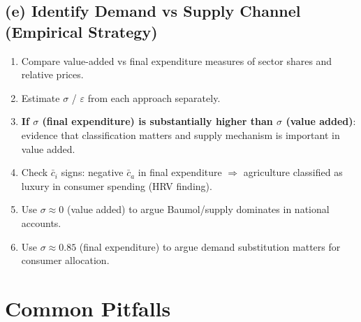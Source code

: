 \documentclass[a4paper,11pt]{article}
\begin{document}
\subsection*{(e) Identify Demand vs Supply Channel (Empirical Strategy)}

\begin{enumerate}
    \item Compare value-added vs final expenditure measures of sector shares and relative prices.
    \item Estimate $\sigma$ / $\varepsilon$ from each approach separately.
    \item \textbf{If $\sigma$ (final expenditure) is substantially higher than $\sigma$ (value added)}: evidence that classification matters and supply mechanism is important in value added.
    \item Check $\bar{c}_i$ signs: negative $\bar{c}_a$ in final expenditure $\Rightarrow$ agriculture classified as luxury in consumer spending (HRV finding).
    \item Use $\sigma \approx 0$ (value added) to argue Baumol/supply dominates in national accounts.
    \item Use $\sigma \approx 0.85$ (final expenditure) to argue demand substitution matters for consumer allocation.
\end{enumerate}

\clearpage

\section{Common Pitfalls}
\end{document}
